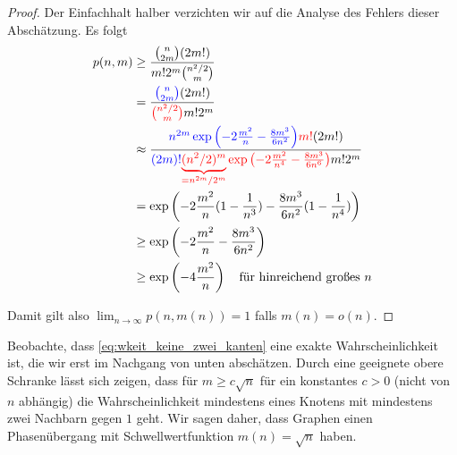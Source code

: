 \begin{proof}
    Der Einfachhalt halber verzichten wir auf die Analyse des Fehlers dieser Abschätzung.
    Es folgt
    \begin{align}
        p(n, m)
         & \ge \frac{\binom{n}{2m} (2m!)}{m! 2^m \binom{n^2/2}{m}}                                                                                   \\
         & = \frac{\textcolor{blue}{\binom{n}{2m}}(2m!)}{\textcolor{red}{\binom{n^2/2}{m}} m! 2^m}                                                   \\
         & \approx \frac{
        \textcolor{blue}{n^{2m} \exp\left(-2\frac{m^2}{n} - \frac{8m^3}{6n^2}\right)}\textcolor{red}{m!}(2m!)
        }{
        \textcolor{blue}{(2m)!}\textcolor{red}{\underbrace{(n^2/2)^m}_{=n^{2m} / 2^m} \exp\left(-2\frac{m^2}{n^4} - \frac{8m^3}{6n^6}\right)} m!2^m} \\
         & = \exp\left(-2\frac{m^2}{n} (1 - \frac{1}{n^3}) - \frac{8m^3}{6n^2} (1 - \frac{1}{n^4}) \right)                                           \\
         & \ge \exp\left(-2\frac{m^2}{n} - \frac{8m^3}{6n^2} \right)                                                                                 \\
         & \ge \exp\left(-4\frac{m^2}{n} \right) \quad \text{für hinreichend großes $n$}
    \end{align}

    Damit gilt also $\lim_{n \to \infty} p(n, m(n)) = 1$ falls $m(n) = o(n)$.
\end{proof}

Beobachte, dass \cref{eq:wkeit_keine_zwei_kanten} eine exakte Wahrscheinlichkeit ist, die wir erst im Nachgang von unten abschätzen.
Durch eine geeignete obere Schranke lässt sich zeigen, dass für $m \ge c \sqrt n$ für ein konstantes $c > 0$ (\dh nicht von $n$ abhängig) die Wahrscheinlichkeit mindestens eines Knotens mit mindestens zwei Nachbarn gegen $1$ geht.
Wir sagen daher, dass \Gnm Graphen einen Phasenübergang mit Schwellwertfunktion $m(n) = \sqrt n$ haben.


\bigskip

